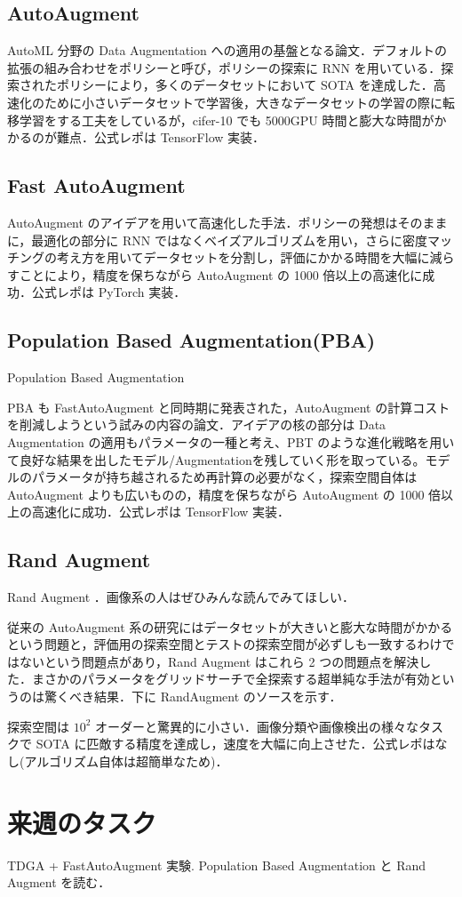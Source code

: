 \documentclass[onecolumn]{ujarticle}   %
\begin{document}
	\subsection{AutoAugment}
	AutoML 分野の Data Augmentation への適用の基盤となる論文．デフォルトの拡張の組み合わせをポリシーと呼び，ポリシーの探索に RNN を用いている．探索されたポリシーにより，多くのデータセットにおいて SOTA を達成した．高速化のために小さいデータセットで学習後，大きなデータセットの学習の際に転移学習をする工夫をしているが，cifer-10 でも 5000GPU 時間と膨大な時間がかかるのが難点．公式レポは TensorFlow 実装．

	\subsection{Fast AutoAugment}
	AutoAugment のアイデアを用いて高速化した手法．ポリシーの発想はそのままに，最適化の部分に RNN ではなくベイズアルゴリズムを用い，さらに密度マッチングの考え方を用いてデータセットを分割し，評価にかかる時間を大幅に減らすことにより，精度を保ちながら AutoAugment の 1000 倍以上の高速化に成功．公式レポは PyTorch 実装．

	\subsection{Population Based Augmentation(PBA)}
	Population Based Augmentation \cite{DBLP:journals/corr/abs-1905-05393}

	PBA も FastAutoAugment と同時期に発表された，AutoAugment の計算コストを削減しようという試みの内容の論文．アイデアの核の部分は Data Augmentation の適用もパラメータの一種と考え、PBT \cite{DBLP:journals/corr/abs-1711-09846} のような進化戦略を用いて良好な結果を出したモデル/Augmentationを残していく形を取っている。モデルのパラメータが持ち越されるため再計算の必要がなく，探索空間自体は AutoAugment よりも広いものの，精度を保ちながら AutoAugment の 1000 倍以上の高速化に成功．公式レポは TensorFlow 実装．

	\subsection{Rand Augment}
	Rand Augment \cite{Cubuk2019RandAugmentPA}．画像系の人はぜひみんな読んでみてほしい．

	従来の AutoAugment 系の研究にはデータセットが大きいと膨大な時間がかかるという問題と，評価用の探索空間とテストの探索空間が必ずしも一致するわけではないという問題点があり，Rand Augment はこれら 2 つの問題点を解決した．まさかのパラメータをグリッドサーチで全探索する超単純な手法が有効というのは驚くべき結果．下に RandAugment のソースを示す．

	
	探索空間は $10^2$ オーダーと驚異的に小さい．画像分類や画像検出の様々なタスクで SOTA に匹敵する精度を達成し，速度を大幅に向上させた．公式レポはなし(アルゴリズム自体は超簡単なため)．

	\section{来週のタスク}
	TDGA + FastAutoAugment 実験. Population Based Augmentation と Rand Augment を読む．

	
	
\end{document}
